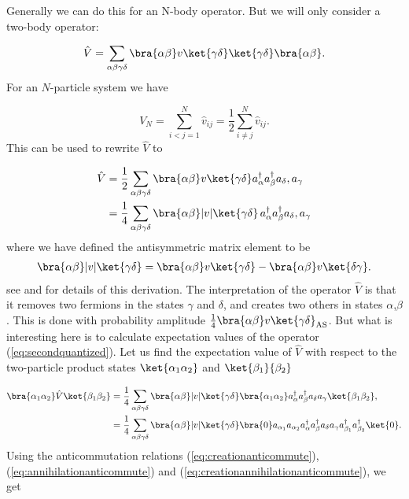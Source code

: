 Generally we can do this for an N-body operator. But we will only consider a two-body operator:

\begin{equation}
\hat{V} = \sum_{\alpha \beta \gamma \delta} \bra{\alpha \beta} v \ket{\gamma \delta}   \ket{\gamma \delta} \bra{\alpha \beta}.
 \label{def:twobodyoperator}
\end{equation}
%
For an $N$-particle system we have

\begin{equation}
V_N = \sum_{i<j=1}^N \hat{v}_{ij} = \frac{1}{2} \sum_{i\neq j}^N \hat{v}_{ij}.
 \label{def:N-twobodyoperator}
\end{equation} 
%
This can be used to rewrite $\hat{V}$ to

\begin{align}
\hat{V} &= \frac{1}{2} \sum_{\alpha\beta\gamma\delta}\bra{\alpha \beta} v \ket{\gamma \delta} a_{\alpha}^\dagger a_{\beta}^\dagger a_{\delta}, a_{\gamma} \\
        &= \frac{1}{4} \sum_{\alpha\beta\gamma\delta} \bra{\alpha \beta}|v|\ket{\gamma \delta} \, a_{\alpha}^\dagger a_{\beta}^\dagger a_{\delta}, a_{\gamma} 
 \label{eq:secondquantized}
\end{align}
%
where we have defined the antisymmetric matrix element to be
\begin{align}
\bra{\alpha \beta} |v| \ket{\gamma \delta} = \bra{\alpha \beta} v \ket{\gamma \delta} - \bra{\alpha \beta} v \ket{\delta\gamma}.
 \label{def:antisymmetrizedmatrix}
\end{align}
see \cite{manybodyjensen} and \cite{dick} for details of this derivation. The interpretation of the operator $\hat{V}$ is that it removes two fermions in the states $\gamma$ and $\delta$, and creates two others in states $\alpha$,$\beta$. This is done with probability amplitude  $\frac{1}{4}\bra{\alpha \beta} v \ket{\gamma \delta}_{\text{AS}}$. 
%
But what is interesting here is to calculate expectation values of the operator (\ref{eq:secondquantized}). Let us find the expectation value of $\hat{V}$ with respect to the two-particle product states $\ket{\alpha_1 \alpha_2}$ and $\ket{\beta_1}{\beta_2}$

\begin{align}
\bra{\alpha_1\alpha_2}\hat{V}\ket{\beta_1\beta_2} &= \frac{1}{4} \sum_{\alpha\beta\gamma\delta} 
 \bra{\alpha \beta} |v| \ket{\gamma \delta}\bra{\alpha_1 \alpha_2} a_{\alpha}^\dagger a_{\beta}^\dagger a_{\delta} a_{\gamma} \ket{\beta_1\beta_2}, \\ 
  & = \frac{1}{4} \sum_{\alpha\beta\gamma\delta} \bra{\alpha \beta} |v| \ket{\gamma \delta}\bra{0} a_{\alpha_1} a_{\alpha_2} a_{\alpha}^\dagger a_{\beta}^\dagger a_{\delta} a_{\gamma} a_{\beta_1}^\dagger a_{\beta_2}^\dagger \ket{0}.
\end{align}
Using the anticommutation relations (\ref{eq:creationanticommute}),(\ref{eq:annihilationanticommute}) and (\ref{eq:creationannihilationanticommute}), we get

